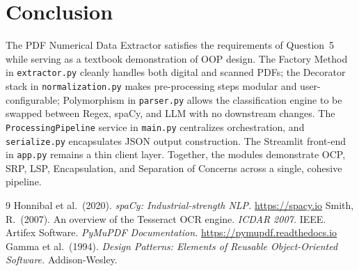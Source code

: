 \documentclass[12pt, a4paper]{article}
\begin{document}
\section{Conclusion}
 
The PDF Numerical Data Extractor satisfies the requirements of Question~5
while serving as a textbook demonstration of OOP design. The Factory Method
in \texttt{extractor.py} cleanly handles both digital and scanned PDFs; the
Decorator stack in \texttt{normalization.py} makes pre-processing steps
modular and user-configurable; Polymorphism in \texttt{parser.py} allows the
classification engine to be swapped between Regex, spaCy, and LLM with no
downstream changes. The \texttt{ProcessingPipeline} service in
\texttt{main.py} centralizes orchestration, and \texttt{serialize.py}
encapsulates JSON output construction. The Streamlit front-end in
\texttt{app.py} remains a thin client layer. Together, the modules
demonstrate OCP, SRP, LSP, Encapsulation, and Separation of Concerns across a
single, cohesive pipeline.
 
\begin{thebibliography}{9}
Honnibal et al.\ (2020). \textit{spaCy: Industrial-strength NLP.}
\url{https://spacy.io}
Smith, R.\ (2007). An overview of the Tesseract OCR engine.
\textit{ICDAR 2007.} IEEE.
Artifex Software. \textit{PyMuPDF Documentation.}
\url{https://pymupdf.readthedocs.io}
Gamma et al.\ (1994). \textit{Design Patterns: Elements of Reusable
Object-Oriented Software.} Addison-Wesley.
\end{thebibliography}
 
\end{document}
